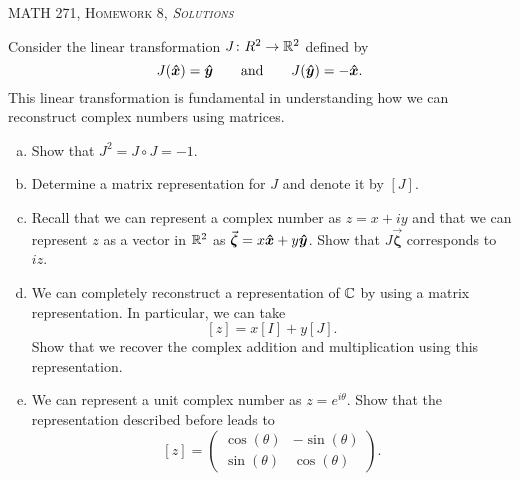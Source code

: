 \documentclass[12pt]{article} %
\begin{document}
\begin{center}
   \textsc{\large MATH 271, Homework 8, \emph{Solutions}}\\
\end{center}
\vspace{.5cm}





\newpage
\begin{problem}
Consider the linear transformation $J \colon R^2 \to \mathbb{R}^2$ defined by
\[
J(\boldsymbol{\hat{x}}) = \boldsymbol{\hat{y}} \qquad \textrm{and} \qquad J(\boldsymbol{\hat{y}}) = -\boldsymbol{\hat{x}}.
\]
This linear transformation is fundamental in understanding how we can reconstruct complex numbers using matrices.
\begin{enumerate}[(a)]
    \item Show that $J^2 = J\circ J= -1$.
    \item Determine a matrix representation for $J$ and denote it by $[J]$.
    \item Recall that we can represent a complex number as $z=x + iy$ and that we can represent $z$ as a vector in $\mathbb{R}^2$ as $\vec{\boldsymbol{\zeta}} = x\boldsymbol{\hat{x}} + y\boldsymbol{\hat{y}}$.  Show that $J \vec{\boldsymbol{\zeta}}$ corresponds to $iz$.
    \item We can completely reconstruct a representation of $\mathbb{C}$ by using a matrix representation.  In particular, we can take
    \[
        [z] = x [I] + y [J].
    \]
    Show that we recover the complex addition and multiplication using this representation.
    \item We can represent a unit complex number as $z=e^{i\theta}$.  Show that the representation described before leads to
    \[
        [z] = \begin{pmatrix} \cos(\theta) & -\sin(\theta) \\ \sin(\theta) & \cos(\theta) \end{pmatrix}.
    \]
\end{enumerate}
\end{problem}
\end{document}
